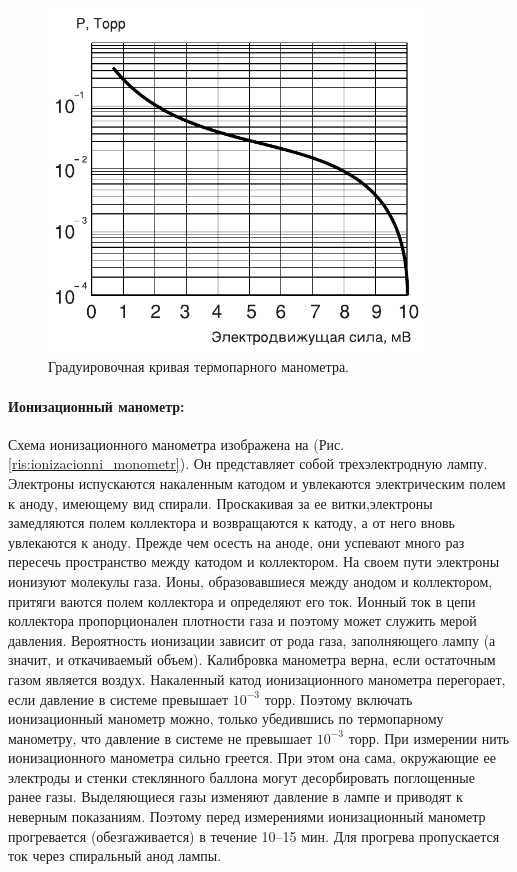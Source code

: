 \documentclass{article}
\begin{document}
\begin{figure}[h]
\begin{minipage}{0.7\textwidth}
        \centering
        \includegraphics[width=0.9\textwidth]{termopara_graduirovka}
        \caption{Градуировочная кривая термопарного манометра.}
        \label{ris:termopara_graduirovka}
    \end{minipage}
    \end{figure}

    \newpage

    \paragraph{Ионизационный манометр:}
    Схема ионизационного манометра изображена на (Рис. \ref{ris:ionizacionni_monometr}). Он представляет собой трехэлектродную лампу. Электроны испускаются накаленным катодом и увлекаются электрическим полем к аноду, имеющему вид спирали. Проскакивая за ее витки,электроны замедляются полем коллектора и возвращаются к катоду, а от него вновь увлекаются к аноду. Прежде чем осесть на аноде, они успевают много раз пересечь пространство между катодом и коллектором. На своем пути электроны ионизуют молекулы газа. Ионы, образовавшиеся между анодом и коллектором, притяги ваются полем коллектора и определяют его ток. Ионный ток в цепи коллектора пропорционален плотности газа и поэтому может служить мерой давления. Вероятность ионизации зависит от рода газа, заполняющего лампу (а значит, и откачиваемый объем). Калибровка манометра верна, если остаточным газом является воздух. Накаленный катод ионизационного манометра перегорает, если давление в системе превышает $10^{-3}$ торр. Поэтому включать ионизационный манометр можно, только убедившись по термопарному манометру, что давление в системе не превышает $10^{-3}$ торр. При измерении нить ионизационного манометра сильно греется. При этом она сама, окружающие ее электроды и стенки стеклянного баллона могут десорбировать поглощенные ранее газы. Выделяющиеся газы изменяют давление в лампе и приводят к неверным показаниям. Поэтому перед измерениями ионизационный манометр прогревается (обезгаживается) в течение 10–15 мин. Для прогрева пропускается ток через спиральный анод лампы.
\end{document}
